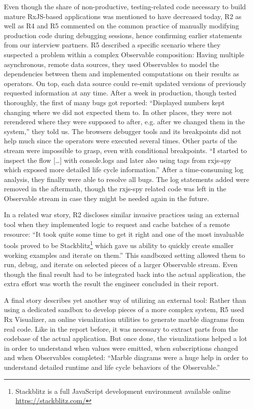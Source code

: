 \documentclass[sigplan,screen,review]{acmart}
\begin{document}
Even though the share of non-productive, testing-related code necessary to build mature RxJS-based applications was mentioned to have decreased today, R2 as well as R4 and R5 commented on the common practice of manually modifying production code during debugging sessions, hence confirming earlier statements from our interview partners. R5 described a specific scenario where they suspected a problem within a complex Observable composition: Having multiple asynchronous, remote data sources, they used Observables to model the dependencies between them and implemented computations on their results as operators. On top, each data source could re-emit updated versions of previously requested information at any time. After a week in production, though tested thoroughly, the first of many bugs got reported: ``Displayed numbers kept changing where we did not expected them to. In other places, they were not rerendered where they were supposed to after, e.g. after we changed them in the system,'' they told us. The browsers debugger tools and its breakpoints did not help much since the operators were executed several times. Other parts of the stream were impossible to grasp, even with conditional breakpoints. ``I started to inspect the flow [\dots] with console.logs and later also using tags from rxjs-spy which exposed more detailed life cycle information.'' After a time-consuming log analysis, they finally were able to resolve all bugs. The log statements added were removed in the aftermath, though the rxjs-spy related code was left in the Observable stream in case they might be needed again in the future.

In a related war story, R2 discloses similar invasive practices using an external tool when they implemented logic to request and cache batches of a remote resource: ``It took quite some time to get it right and one of the most invaluable tools proved to be Stackblitz\footnote{Stackblitz is a full JavaScript development environment available online \url{https://stackblitz.com/}} which gave us ability to quickly create smaller working examples and iterate on them.'' This sandboxed setting allowed them to run, debug, and iterate on selected pieces of a larger Observable stream. Even though the final result had to be integrated back into the actual application, the extra effort was worth the result the engineer concluded in their report.

A final story describes yet another way of utilizing an external tool: Rather than using a dedicated sandbox to develop pieces of a more complex system, R5 used Rx Visualizer, an online visualization utilities to generate marble diagrams from real code. Like in the report before, it was necessary to extract parts from the codebase of the actual application. But once done, the visualizations helped a lot in order to understand when values were emitted, when subscriptions changed and when Observables completed: ``Marble diagrams were a huge help in order to understand detailed runtime and life cycle behaviors of the Observable.''
\end{document}
